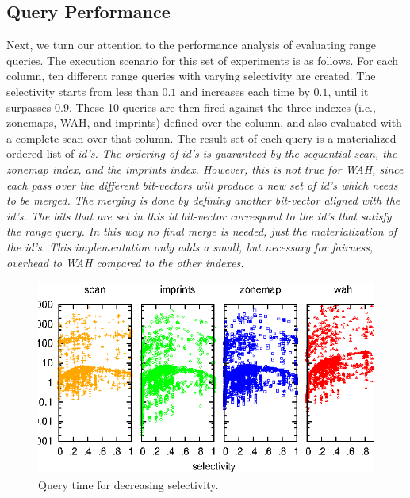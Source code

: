 \subsection{Query Performance}

Next, we turn our attention to the performance analysis of evaluating range
queries. The execution scenario for this set of experiments is as follows. For
each column, ten different range queries with varying selectivity are created.
The selectivity starts from less than $0.1$ and increases each time by
$0.1$, until it surpasses $0.9$. These 10 queries are then fired against the
three indexes (i.e., zonemaps, WAH, and imprints) defined over the column,
and also evaluated with a complete scan over that column. The result set of
each query is a materialized ordered list of \it{id}'s. The ordering of
\it{id}'s is guaranteed by the sequential scan, the zonemap index, and the
imprints index. However, this is not true for WAH, since each pass over the
different bit-vectors will produce a new set of \it{id}'s which needs to be
merged. The merging is done by defining another bit-vector aligned with the
\it{id}'s. The bits that are set in this \it{id} bit-vector correspond to the
\it{id}'s that satisfy the range query. In this way no final merge is needed,
just the materialization of the \it{id}'s. This implementation only adds a
small, but necessary for fairness, overhead to WAH compared to the other
indexes.

\begin{figure}
\includegraphics{figs/static/qtime}
\caption{Query time for decreasing selectivity.}
\label{fig:queryt}
\end{figure}

